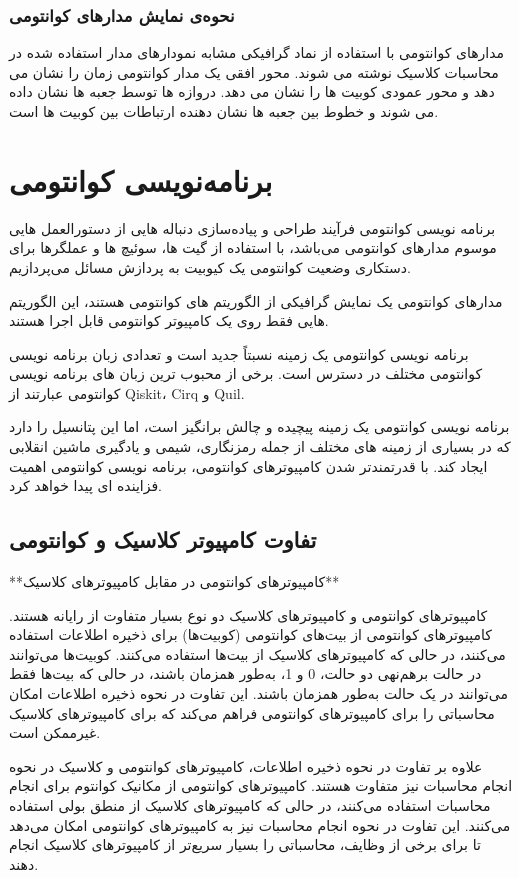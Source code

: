 \documentclass{book}
\begin{document}
\subsection{نحوه‌ی نمایش مدار‌های کوانتومی}


مدارهای کوانتومی با استفاده از نماد گرافیکی مشابه نمودارهای مدار استفاده شده در محاسبات کلاسیک نوشته می شوند. محور افقی یک مدار کوانتومی زمان را نشان می دهد و محور عمودی کوبیت ها را نشان می دهد. دروازه ها توسط جعبه ها نشان داده می شوند و خطوط بین جعبه ها نشان دهنده ارتباطات بین کوبیت ها است.

\newpage
\chapter{برنامه‌نویسی کوانتومی}
برنامه نویسی کوانتومی فرآیند طراحی و پیاده‌سازی دنباله هایی از دستورالعمل هایی موسوم مدارهای کوانتومی می‌باشد، با استفاده از گیت ها، سوئیچ ها و عملگرها برای دستکاری وضعیت کوانتومی یک کیوبیت به پردازش مسائل می‌پردازیم.

مدارهای کوانتومی یک نمایش گرافیکی از الگوریتم های کوانتومی هستند، این الگوریتم هایی فقط روی یک کامپیوتر کوانتومی قابل اجرا هستند.

برنامه نویسی کوانتومی یک زمینه نسبتاً جدید است و تعدادی زبان برنامه نویسی کوانتومی مختلف در دسترس است. برخی از محبوب ترین زبان های برنامه نویسی کوانتومی عبارتند از Qiskit، Cirq و Quil.

برنامه نویسی کوانتومی یک زمینه پیچیده و چالش برانگیز است، اما این پتانسیل را دارد که در بسیاری از زمینه های مختلف از جمله رمزنگاری، شیمی و یادگیری ماشین انقلابی ایجاد کند. با قدرتمندتر شدن کامپیوترهای کوانتومی، برنامه نویسی کوانتومی اهمیت فزاینده ای پیدا خواهد کرد.
\section{تفاوت کامپیوتر کلاسیک و کوانتومی}

**کامپیوترهای کوانتومی در مقابل کامپیوترهای کلاسیک**

کامپیوترهای کوانتومی و کامپیوترهای کلاسیک دو نوع بسیار متفاوت از رایانه هستند. کامپیوترهای کوانتومی از بیت‌های کوانتومی (کوبیت‌ها) برای ذخیره اطلاعات استفاده می‌کنند، در حالی که کامپیوترهای کلاسیک از بیت‌ها استفاده می‌کنند. کوبیت‌ها می‌توانند در حالت برهم‌نهی دو حالت، 0 و 1، به‌طور همزمان باشند، در حالی که بیت‌ها فقط می‌توانند در یک حالت به‌طور همزمان باشند. این تفاوت در نحوه ذخیره اطلاعات امکان محاسباتی را برای کامپیوترهای کوانتومی فراهم می‌کند که برای کامپیوترهای کلاسیک غیرممکن است.

علاوه بر تفاوت در نحوه ذخیره اطلاعات، کامپیوترهای کوانتومی و کلاسیک در نحوه انجام محاسبات نیز متفاوت هستند. کامپیوترهای کوانتومی از مکانیک کوانتوم برای انجام محاسبات استفاده می‌کنند، در حالی که کامپیوترهای کلاسیک از منطق بولی استفاده می‌کنند. این تفاوت در نحوه انجام محاسبات نیز به کامپیوترهای کوانتومی امکان می‌دهد تا برای برخی از وظایف، محاسباتی را بسیار سریع‌تر از کامپیوترهای کلاسیک انجام دهند.
\end{document}
